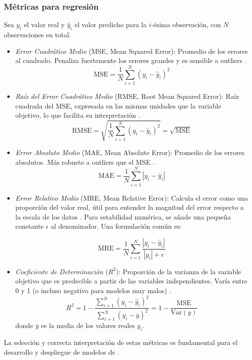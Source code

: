 \newpage

\subsubsection*{Métricas para regresión}
\label{subsec:Metricas}
Sea $y_i$ el valor real y $\hat{y}_i$ el valor predicho para la $i$-ésima observación, con $N$ observaciones en total.
\begin{itemize}
    \item \textit{Error Cuadrático Medio} (MSE, Mean Squared Error): Promedio de los errores al cuadrado. Penaliza fuertemente los errores grandes y es sensible a outliers \citep{Lehmann1998}.
    \[
    \text{MSE} = \frac{1}{N} \sum_{i=1}^{N} (y_i - \hat{y}_i)^2
    \]


    \item \textit{Raíz del Error Cuadrático Medio} (RMSE, Root Mean Squared Error): Raíz cuadrada del MSE, expresada en las mismas unidades que la variable objetivo, lo que facilita su interpretación \citep{Chai2014}.
    \[
    \text{RMSE} = \sqrt{\frac{1}{N} \sum_{i=1}^{N} (y_i - \hat{y}_i)^2} = \sqrt{\text{MSE}}
    \]

    \item \textit{Error Absoluto Medio} (MAE, Mean Absolute Error): Promedio de los errores absolutos. Más robusto a outliers que el MSE \citep{Willmott2005}.
    \[
    \text{MAE} = \frac{1}{N} \sum_{i=1}^{N} |y_i - \hat{y}_i|
    \]

    \item \textit{Error Relativo Medio} (MRE, Mean Relative Error): Calcula el error como una proporción del valor real, útil para entender la magnitud del error respecto a la escala de los datos \citep{Hyndman2006another}. Para estabilidad numérica, se añade una pequeña constante $\epsilon$ al denominador. Una formulación común es:

    \[
    \text{MRE} = \frac{1}{N} \sum_{i=1}^{N} \frac{|y_i - \hat{y}_i|}{|y_i| + \epsilon}\]


    \item \textit{Coeficiente de Determinación} ($R^2$): Proporción de la varianza de la variable objetivo que es predecible a partir de las variables independientes. Varía entre 0 y 1 (o incluso negativo para modelos muy malos) \citep{Nagelkerke1991}.
    \[
    R^2 = 1 - \frac{\sum_{i=1}^{N} (y_i - \hat{y}_i)^2}{\sum_{i=1}^{N} (y_i - \bar{y})^2} = 1 - \frac{\text{MSE}}{\text{Var}(y)}
    \]
    donde $\bar{y}$ es la media de los valores reales $y_i$.
\end{itemize}
La selección y correcta interpretación de estas métricas es fundamental para el desarrollo y despliegue de modelos de 
\citep{Japkowicz2011}.

